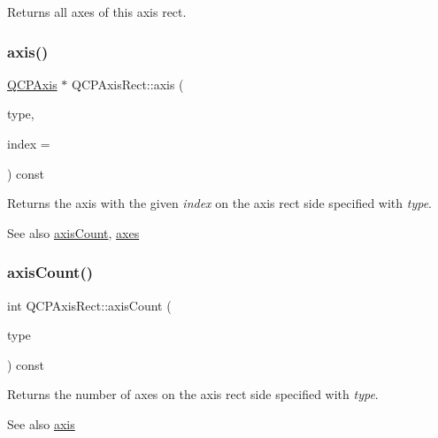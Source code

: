 Returns all axes of this axis rect. \mbox{\label{class_q_c_p_axis_rect_a583ae4f6d78b601b732183f6cabecbe1}} 
\subsubsection{\texorpdfstring{axis()}{axis()}}
{\footnotesize\ttfamily \mbox{\hyperlink{class_q_c_p_axis}{Q\+C\+P\+Axis}} $\ast$ Q\+C\+P\+Axis\+Rect\+::axis (\begin{DoxyParamCaption}\item[{\mbox{\hyperlink{class_q_c_p_axis_ae2bcc1728b382f10f064612b368bc18a}{Q\+C\+P\+Axis\+::\+Axis\+Type}}}]{type,  }\item[{int}]{index = {} }\end{DoxyParamCaption}) const}

Returns the axis with the given {\itshape index} on the axis rect side specified with {\itshape type}.

\begin{DoxySeeAlso}{See also}
\mbox{\hyperlink{class_q_c_p_axis_rect_a85b321acec0f694d8b5fdeafdbff3133}{axis\+Count}}, \mbox{\hyperlink{class_q_c_p_axis_rect_a8db4722cb93e9c4a6f0d91150c200867}{axes}} 
\end{DoxySeeAlso}
\mbox{\label{class_q_c_p_axis_rect_a85b321acec0f694d8b5fdeafdbff3133}} 
\subsubsection{\texorpdfstring{axisCount()}{axisCount()}}
{\footnotesize\ttfamily int Q\+C\+P\+Axis\+Rect\+::axis\+Count (\begin{DoxyParamCaption}\item[{\mbox{\hyperlink{class_q_c_p_axis_ae2bcc1728b382f10f064612b368bc18a}{Q\+C\+P\+Axis\+::\+Axis\+Type}}}]{type }\end{DoxyParamCaption}) const}

Returns the number of axes on the axis rect side specified with {\itshape type}.

\begin{DoxySeeAlso}{See also}
\mbox{\hyperlink{class_q_c_p_axis_rect_a583ae4f6d78b601b732183f6cabecbe1}{axis}} 
\end{DoxySeeAlso}
\mbox{\label{class_q_c_p_axis_rect_a572deec9c9a4d5987d5c5f78521991e6}} 
